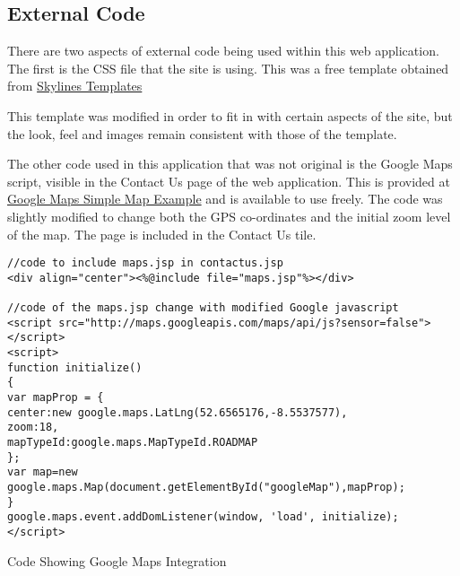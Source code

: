 \subsection{External Code}

There are two aspects of external code being used within this web application. The first is the CSS file that the site is using. This was a free template obtained from \href{http://skylinestemplates.blogspot.ie/2011/11/greefies-solution-xhtml-and-css.html}{Skylines Templates}

This template was modified in order to fit in with certain aspects of the site, but the look, feel and images remain consistent with those of the template.

The other code used in this application that was not original is the Google Maps script, visible in the Contact Us page of the web application. This is provided at \href{https://developers.google.com/maps/documentation/javascript/examples/map-simple}{Google Maps Simple Map Example} and is available to use freely. The code was slightly modified to change both the GPS co-ordinates and the initial zoom level of the map. The page is included in the Contact Us tile.\newline

\begin{table}[H]
\begin{lstlisting}
//code to include maps.jsp in contactus.jsp
<div align="center"><%@include file="maps.jsp"%></div>

//code of the maps.jsp change with modified Google javascript
<script src="http://maps.googleapis.com/maps/api/js?sensor=false">
</script>
<script>
function initialize()
{
var mapProp = {
center:new google.maps.LatLng(52.6565176,-8.5537577),
zoom:18,
mapTypeId:google.maps.MapTypeId.ROADMAP
};
var map=new google.maps.Map(document.getElementById("googleMap"),mapProp);
}
google.maps.event.addDomListener(window, 'load', initialize);
</script>

\end{lstlisting}
\caption{Code Showing Google Maps Integration}
\end{table}





